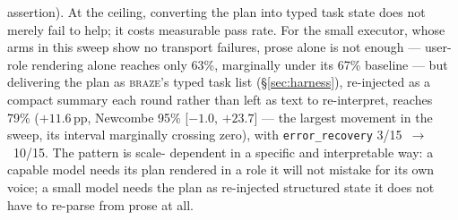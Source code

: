 \documentclass[smallcondensed,natbib]{svjour3}
\newcommand{\braze}{\textsc{braze}}
\begin{document}
assertion). At the ceiling, converting the plan into typed task
state does not merely fail to help; it costs measurable pass rate.
For the small executor, whose arms
in this sweep show no transport failures, prose alone is not enough ---
user-role rendering alone reaches only 63\%, marginally under its
67\% baseline --- but delivering the plan as \braze{}'s typed task list
(\S\ref{sec:harness}), re-injected as a compact summary each round
rather than left as text to re-interpret, reaches 79\%
($+11.6$\,pp, Newcombe 95\% [$-1.0$, $+23.7$] --- the largest movement
in the sweep, its interval marginally crossing zero), with
\texttt{error\_recovery} 3/15~$\to$~10/15. The pattern is scale-
dependent in a specific and interpretable way: a capable model needs
its plan rendered in a role it will not mistake for its own voice; a
small model needs the plan as re-injected structured state it does not
have to re-parse from prose at all.
\end{document}
